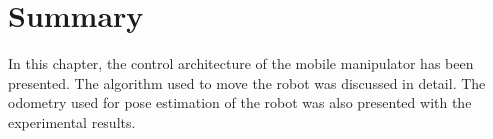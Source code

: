 

\section{Summary}
In this chapter, the control architecture of the mobile manipulator has been presented. The  algorithm used  to move the robot was discussed in detail. The odometry used for pose estimation of the robot was also presented with the experimental results. 

